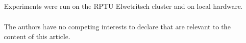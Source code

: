 \documentclass[runningheads]{llncs}
\begin{document}
\begin{credits}
\subsubsection{\ackname}
Experiments were run on the RPTU Elwetritsch cluster and on local hardware.

\subsubsection{\discintname}
The authors have no competing interests to declare that are relevant to the content of this article.
\end{credits}



\end{document}
